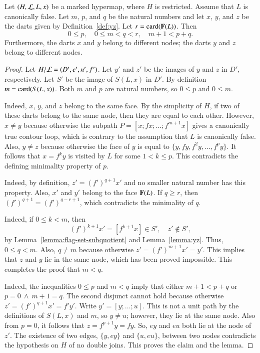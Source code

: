 \begin{lemma}[parameters]\label{lemma:parameters}
Let $(H,{\cal L},L,x)$ be a
marked hypermap, where $H$ is restricted. Assume that $L$ is canonically false.
Let $m$, $p$, and $q$ be the natural numbers and let $x$, $y$, and $z$ be the darts given by
Definition~\ref{def:yz}.  Let $r = {\operatorname{card}}({\mathbf F}(L))$.  Then
\[ 
0\le p,\quad 0\le m < q < r,\quad m+1 < p+q.
\] 
Furthermore, the darts $x$ and $y$ belong to different nodes; the darts
$y$ and $z$ belong to different nodes.
\end{lemma}

\begin{proof}
Let $H/{\cal L}=(D',e',n',f')$.  Let $y'$ and $z'$ be the images of $y$ and $z$
in $D'$, respectively.  Let $S'$ be the image of $S(L,x)$ in $D'$.
By definition $m = {\operatorname{card}}(S(L,x))$.  Both $m$ and $p$ are natural numbers,
so $0\le p$ and $0\le m$. 

  Indeed, $x$, $y$, and $z$ belong to
the same face.  By the simplicity of $H$, if two of these darts belong
to the same node, then they are equal to each other.  However, $x\ne
y$ because otherwise the subpath $P=[x;f x;\ldots;f^{m+1}x]$ gives a canonically true contour loop, which is contrary to the assumption that $L$ is
canonically false.  Also, $y\ne z$ because otherwise the face of $y$ is
equal to $\{y,f y,f^2 y,\ldots,f^p y\}$.  It follows that $x = f^k y$
is visited by $L$ for some $1<k\le p$.  This contradicts the defining
minimality property of $p$.

  Indeed,
by definition, $z' = (f')^{q+1} x'$ and no smaller natural
number has this property.  Also, $x'$ and $y'$ belong to the face ${\mathbf F}(L)$.
If $q\ge r$, then $(f')^{q+1} = (f')^{q-r+1}$, which contradicts the minimality of $q$.

 Indeed, if $0\le k< m$, then
\[ 
(f')^{k+1} x' = [f^{k+1} x]\in S', \quad z' \not\in S',
\] 
by Lemma~\ref{lemma:flag-set-subquotient} and Lemma~\ref{lemma:yz}.
Thus, $0\le q< m$.  Also, $q\ne m$ because otherwise $z' = (f')^{m+1} x'
= y'$.  This implies that $z$ and $y$ lie in the same node, which has
been proved impossible.  This completes the proof that $m<q$.
 
  Indeed, the inequalities $0\le p$ and $m<q$ imply
that either $m+1 < p+q$ or $p=0~\land~m+1=q$.  The second disjunct
cannot hold because otherwise $z' = (f')^{q+1} x' = f' y'$.  Write $y' = [y;\ldots;u]$.
This is not a unit path by the definitions of $S(L,x)$ and $m$, so $y\ne u$; however,
they lie at the same node.  Also from $p=0$, it follows that $z= f^{p+1} y = f y$.
So, $e y$ and $e u$ both lie at the node of $z'$.  The existence of
 two edges, $\{y, e y\}$ and
$\{u, e u\}$, between two nodes contradicts the hypothesis
on $H$ of no double joins.  This proves the claim and the lemma.
\end{proof}


